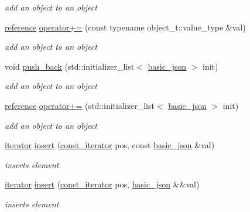 \begin{DoxyCompactItemize}
\begin{DoxyCompactList}\small\item\em add an object to an object \end{DoxyCompactList}\item 
\hyperlink{classnlohmann_1_1basic__json_a3ec8e17be8732fe436e9d6733f52b7a3}{reference} \hyperlink{classnlohmann_1_1basic__json_a9486a272e034c0548305d7a12f3045e6}{operator+=} (const typename object\+\_\+t\+::value\+\_\+type \&val)
\begin{DoxyCompactList}\small\item\em add an object to an object \end{DoxyCompactList}\item 
void \hyperlink{classnlohmann_1_1basic__json_a9c9b4932b26a9630e1a3f25ea42a2c43}{push\+\_\+back} (std\+::initializer\+\_\+list$<$ \hyperlink{classnlohmann_1_1basic__json}{basic\+\_\+json} $>$ init)
\begin{DoxyCompactList}\small\item\em add an object to an object \end{DoxyCompactList}\item 
\hyperlink{classnlohmann_1_1basic__json_a3ec8e17be8732fe436e9d6733f52b7a3}{reference} \hyperlink{classnlohmann_1_1basic__json_aa0033766b4d3134b9bb57d81762d75a2}{operator+=} (std\+::initializer\+\_\+list$<$ \hyperlink{classnlohmann_1_1basic__json}{basic\+\_\+json} $>$ init)
\begin{DoxyCompactList}\small\item\em add an object to an object \end{DoxyCompactList}\item 
\hyperlink{classnlohmann_1_1basic__json_1_1iterator}{iterator} \hyperlink{classnlohmann_1_1basic__json_a7f7bbb3a9efef2e2442f538a24c1c47b}{insert} (\hyperlink{classnlohmann_1_1basic__json_1_1const__iterator}{const\+\_\+iterator} pos, const \hyperlink{classnlohmann_1_1basic__json}{basic\+\_\+json} \&val)
\begin{DoxyCompactList}\small\item\em inserts element \end{DoxyCompactList}\item 
\hyperlink{classnlohmann_1_1basic__json_1_1iterator}{iterator} \hyperlink{classnlohmann_1_1basic__json_a8468efcfcd95db15f46887b29924ed5c}{insert} (\hyperlink{classnlohmann_1_1basic__json_1_1const__iterator}{const\+\_\+iterator} pos, \hyperlink{classnlohmann_1_1basic__json}{basic\+\_\+json} \&\&val)
\begin{DoxyCompactList}\small\item\em inserts element \end{DoxyCompactList}\item 

\end{DoxyCompactItemize}
